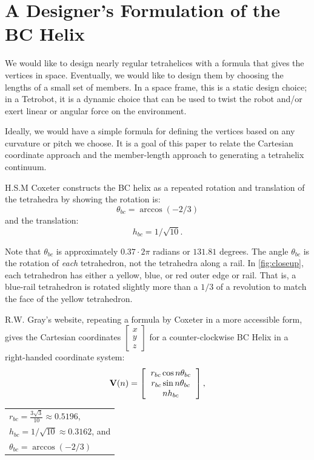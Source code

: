 \documentclass[twocolumn,10pt]{asme2ej}
\renewcommand{\vec}[1]{\mathbf{#1}}
\begin{document}
\section{A Designer's Formulation of the BC Helix}

We would like to design nearly regular tetrahelices with a formula that
gives the vertices in space. Eventually, we would like to design them
by choosing the lengths of a small set of members.
In a space frame, this is a static design choice; in a Tetrobot, it is a
dynamic choice that can be used to twist the robot and/or exert linear or
angular force on the environment.

Ideally, we would have a simple formula for defining the vertices based on
any curvature or pitch we choose. It is a goal of
this paper to relate the Cartesian coordinate approach and the member-length approach to
generating a tetrahelix continuum.


H.S.M Coxeter constructs the BC helix\cite{coxeter1985simplicial} as a repeated rotation and
translation of the tetrahedra by showing the
rotation is:
\begin{equation}
\theta_{bc} = \arccos(-2/3) 
\end{equation}
and the translation:
\begin{equation}
h_{bc} = 1/\sqrt{10}.
\end{equation}

Note that $\theta_{bc}$ is approximately $0.37 \cdot 2 \pi$ radians or  $131.81$ degrees.
The angle $\theta_{bc}$ is the rotation of \emph{each} tetrahedron, not the tetrahedra along a rail.  In \cref{fig:closeup},
each tetrahedron has either a yellow, blue, or red outer edge or rail.
That is, a blue-rail tetrahedron is rotated slightly more than a $1/3$ of a revolution to match the face of the yellow tetrahedron.

R.W. Gray's website\cite{graytetrahelix}, repeating a formula by Coxeter\cite{coxeter1985simplicial} in a more accessible form, gives the Cartesian coordinates $\begin{bmatrix}
           x \\
           y \\
           z
         \end{bmatrix}$
for a counter-clockwise BC Helix in a right-handed coordinate system:
\begin{equation}
  \label{graycoxeter}
\vec{V}(n) =
\left [
  \begin{tabular}{c}
   $ r_{bc} \cos{n \theta_{bc}} $\\
   $ r_{bc} \sin{n \theta_{bc}} $\\
   $ n h_{bc}  $
  \end{tabular}
  \right ],
\end{equation}
  \begin{tabular}{l}
 $ r_{bc} = \frac{3\sqrt{3}}{10} \approx 0.5196 $,\\
 $ h_{bc} = 1/\sqrt{10} \approx 0.3162 $, and \\
 $ \theta_{bc} = \arccos(-2/3) $  \text{,}\\
  \end{tabular}      
\end{document}
